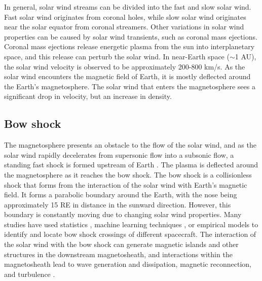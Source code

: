 In general, solar wind streams can be divided into the fast and slow solar wind. Fast solar wind originates from coronal holes, while slow solar wind originates near the solar equator from coronal streamers. Other variations in solar wind properties can be caused by solar wind transients, such as coronal mass ejections. Coronal mass ejections release energetic plasma from the sun into interplanetary space, and this release can perturb the solar wind. In near-Earth space ($\sim$1 \gls{AU}), the solar wind velocity is observed to be approximately 200-800 km/s. As the solar wind encounters the magnetic field of Earth, it is mostly deflected around the Earth's magnetosphere. The solar wind that enters the magnetosphere sees a significant drop in velocity, but an increase in density.

\subsection{Bow shock}
The magnetosphere presents an obstacle to the flow of the solar wind, and as the solar wind rapidly decelerates from supersonic flow into a subsonic flow, a standing fast shock is formed upstream of Earth \citep{Dimmock:2013}. The plasma is deflected around the magnetosphere as it reaches the bow shock. The bow shock is a collisionless shock that forms from the interaction of the solar wind with Earth's magnetic field. It forms a parabolic boundary around the Earth, with the nose being approximately 15 \gls{RE} in distance in the sunward direction. However, this boundary is constantly moving due to changing solar wind properties. Many studies have used statistics \citep{Kruparova:2019}, machine learning techniques \citep{Lalti:2022}, or empirical models \citep{chapman_three-dimensional_2003} to identify and locate bow shock crossings of different spacecraft. The interaction of the solar wind with the bow shock can generate magnetic islands and other structures \citep{Karimabadi:2014} in the downstream magnetosheath, and interactions within the magnetosheath lead to wave generation and dissipation, magnetic reconnection, and turbulence \citep{Shaikh:2022}. %

